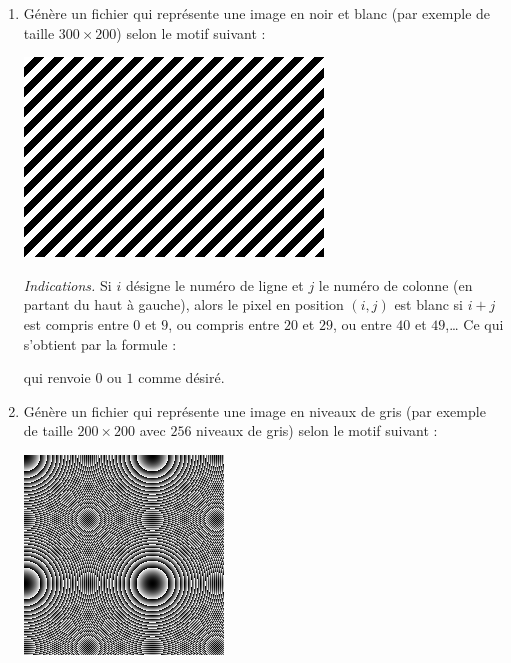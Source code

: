 \documentclass[11pt,class=report,crop=false]{standalone}
\begin{document}
\begin{activite}



\begin{enumerate}
  \item Génère un fichier  qui représente une image en noir et blanc (par exemple de taille $300 \times 200$) selon le motif suivant :
\begin{center}
\includegraphics[scale=0.5]{ecran-image_nb}
\end{center}   

\emph{Indications.} Si $i$ désigne le numéro de ligne et $j$ le numéro de colonne (en partant du haut à gauche), alors le pixel en position $(i,j)$ est blanc si $i+j$ est compris entre $0$ et $9$, ou compris entre $20$ et $29$, ou entre $40$ et $49$,\ldots{} Ce qui s'obtient par la formule :\\
\centerline{}
qui renvoie $0$ ou $1$ comme désiré.

  \item  Génère un fichier  qui représente une image en niveaux de gris (par exemple de taille $200 \times 200$ avec $256$ niveaux de gris) selon le motif suivant :
\begin{center}
\includegraphics[scale=0.7]{ecran-image_gris}
\end{center}   


\end{enumerate}
\end{activite}
\end{document}

